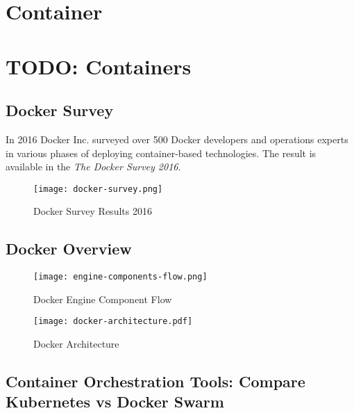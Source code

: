 \chapter{Container}

\FILENAME

\chapter{TODO: Containers}\label{pi-cluster-form-factor}

\section{Docker Survey}

In 2016 Docker Inc. surveyed over 500 Docker developers and operations
experts in various phases of deploying container-based
technologies. The result is available in the {\em The Docker Survey
  2016}.


\begin{figure}[htb]
\centering
\texttt{[image: docker-survey.png]}
\caption{Docker Survey Results 2016
}
\end{figure}


\section{Docker Overview}



\begin{figure}[htb]
\centering
\texttt{[image: engine-components-flow.png]}
\caption{ Docker Engine Component Flow }
\end{figure}

\begin{figure}[htb]
\centering
\texttt{[image: docker-architecture.pdf]}
\caption{ Docker Architecture }
\end{figure}



\section{Container Orchestration Tools: Compare Kubernetes vs Docker Swarm}


